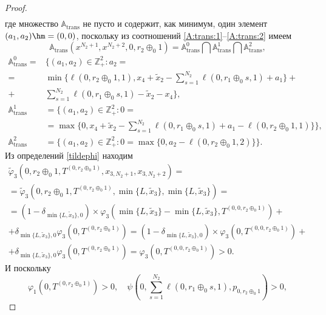 \begin{proof}
\begin{multline*}
\end{multline*}
где множество ${\mathbb A}_{\mathrm{trans}}$ не пусто и содержит,  как минимум,  один элемент $(a_1,  a_2)\hm=(0, 0)$,  поскольку из соотношений \eqref{A:trans:1}--\eqref{A:trans:2} имеем
\begin{equation*}
    {\mathbb A}_{\mathrm{trans}}(x^{N_2+1},  x^{N_2+2},  0,  r_2 \oplus_0 1) = {\mathbb A}_{\mathrm{trans}}^0 \bigcap {\mathbb A}_{\mathrm{trans}}^1\bigcap {\mathbb A}_{\mathrm{trans}}^2,
\end{equation*}
\begin{align*}
{\mathbb A}_{\mathrm{trans}}^0 =& \{(a_1,  a_2) \in \mathbb{Z}_+^2 \colon a_2 =\\
=&\min{\{\ell(0,  r_2 \oplus_0 1,  1),  x_4 + \tilde{x}_2 - \sum_{s=1}^{N_2} \ell(0, r_1 \oplus_0 s, 1) + a_1}\}   + \\
+&\sum_{s=1}^{N_2} \ell(0, r_1 \oplus_0 s, 1) -\tilde{x}_2 - x_4 \}, \\
{\mathbb A}_{\mathrm{trans}}^1 &= \{(a_1,  a_2) \in \mathbb{Z}_+^2 \colon 0 =\\
&= \max{\{0,  x_4 + \tilde{x}_2 - \sum_{s=1}^{N_2} \ell(0, r_1 \oplus_0 s, 1) + a_1-\ell(0,  r_2 \oplus_0 1,  1)\}}\}, \\
{\mathbb A}_{\mathrm{trans}}^2 &= \{(a_1,  a_2) \in \mathbb{Z}_+^2 \colon  0 = \max{\{0,  a_2-\ell(0,  r_2 \oplus_0 1,  2)\}}\}.
\end{align*}
Из определений \eqref{tildephi} находим
\begin{multline*}
\widetilde{\varphi}_3(0, r_2 \oplus_0 1,  T^{(0, r_2 \oplus_0 1)},  x_{3,  N_2+1}, x_{3,  N_2+2})= \\
=\widetilde{\varphi}_3(0, r_2 \oplus_0 1,  T^{(0, r_2 \oplus_0 1)},  \min\{L,  \tilde{x}_3\},  \min\{L,  \tilde{x}_3\})=\\
= (1-\delta_{\min\{L,  \tilde{x}_3\},  0}) \times \varphi_3(\min\{L,  \tilde{x}_3\} - \min\{L,  \tilde{x}_3\},  T^{(0,  0, r_2 \oplus_0 1)} ) +\\
+\delta_{\min\{L,  \tilde{x}_3\},  0} \varphi_3 (0,  T^{(0, r_2 \oplus_0 1)})
= (1-\delta_{\min\{L,  \tilde{x}_3\},  0}) \times \varphi_3(0,  T^{(0,  0, r_2 \oplus_0 1)} ) +\\
+\delta_{\min\{L,  \tilde{x}_3\},  0} \varphi_3 (0,  T^{(0, r_2 \oplus_0 1)}) = \varphi_3(0,  T^{(0,  0, r_2 \oplus_0 1)} ) > 0.
\end{multline*}
И поскольку 
\begin{equation*}
\varphi_1(0,  T^{(0,  r_2 \oplus_0 1)}) > 0,  \quad \psi(0,  \sum_{s=1}^{N_2} \ell(0, r_1 \oplus_0 s, 1),  p_{0,  r_2 \oplus_0 1}) > 0, 

\end{equation*}
\end{proof}
